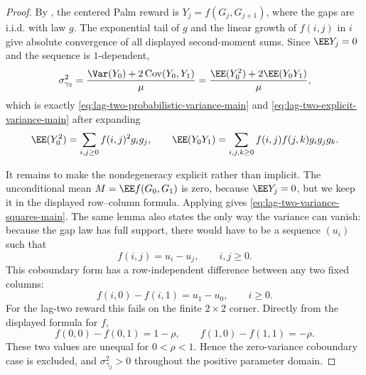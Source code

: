 \begin{proof}
By , the centered Palm reward is
\(Y_j=f(G_j,G_{j+1})\), where the gaps are i.i.d. with law \(g\).  The
exponential tail of \(g\) and the linear growth of \(f(i,j)\) in \(i\) give
absolute convergence of all displayed second-moment sums.  Since
\(\EE Y_j=0\) and the sequence is \(1\)-dependent,
\[
\sigma_{\gamma_2}^2
=\frac{\Var(Y_0)+2\operatorname{Cov}(Y_0,Y_1)}{\mu}
=\frac{\EE(Y_0^2)+2\EE(Y_0Y_1)}{\mu},
\]
which is exactly \eqref{eq:lag-two-probabilistic-variance-main} and
\eqref{eq:lag-two-explicit-variance-main} after expanding
\[
\EE(Y_0^2)=\sum_{i,j\ge0}f(i,j)^2g_ig_j,\qquad
\EE(Y_0Y_1)=\sum_{i,j,k\ge0}f(i,j)f(j,k)g_ig_jg_k .
\]

It remains to make the nondegeneracy explicit rather than implicit.  The
unconditional mean \(M=\EE f(G_0,G_1)\) is zero, because \(\EE Y_j=0\), but
we keep it in the displayed row--column formula.  Applying
 gives
\eqref{eq:lag-two-variance-squares-main}.  The same lemma also states the
only way the variance can vanish: because the gap law has full support, there
would have to be a sequence \((u_i)\) such that
\[
f(i,j)=u_i-u_j,\qquad i,j\ge0 .
\]
This coboundary form has a row-independent difference between any two fixed
columns:
\[
f(i,0)-f(i,1)=u_1-u_0,\qquad i\ge0 .
\]
For the lag-two reward this fails on the finite \(2\times2\) corner.  Directly
from the displayed formula for \(f\),
\[
f(0,0)-f(0,1)=1-\rho,\qquad
f(1,0)-f(1,1)=-\rho .
\]
These two values are unequal for \(0<\rho<1\).  Hence the zero-variance
coboundary case is excluded, and \(\sigma_{\gamma_2}^2>0\) throughout the
positive parameter domain.
\end{proof}

